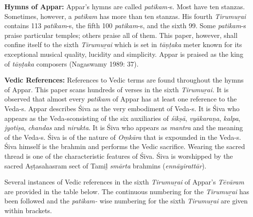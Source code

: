 \textbf{Hymns of Appar:} Appar’s hymns are called \textit{patikam-}s. Most have ten stanzas. Sometimes, however, a \textit{patikam} has more than ten stanzas. His fourth \textit{Tirumuṟai }contains 113 \textit{patikam}-s, the fifth 100 \textit{patikam}-s, and the sixth 99. Some \textit{patikam}-s praise particular temples; others praise all of them. This paper, however, shall confine itself to the sixth \textit{Tirumuṟai} which is set in \textit{tāṇṭaka} meter known for its exceptional musical quality, lucidity and simplicity. Appar is praised as the king of \textit{tāṇṭaka }composers (Nagaswamy 1989: 37).

\textbf{Vedic References:} References to Vedic terms are found throughout the hymns of Appar. This paper scans hundreds of verses in the sixth \textit{Tirumuṟai. }It is observed that almost every \textit{patikam} of Appar has at least one reference to the Veda-s. Appar describes Śiva as the very embodiment of Veda-s. It is Śiva who appears as the Veda-s\break consisting of the six auxiliaries of \textit{śikṣā}, \textit{vyākaraṇa}, \textit{kalpa}, \textit{jyotiṣa}, \textit{chandas} and \textit{nirukta}. It is Śiva who appears as \textit{mantra} and the meaning of the Veda-s. Śiva is of the nature of \textit{Oṃkāra }that is expounded in the Veda-s. Śiva himself is the brahmin and performs the Vedic sacrifice. Wearing the sacred thread is one of the characteristic features of Śiva. Śiva is worshipped by the sacred Aṣṭasahasram sect of Tamiḻ \textit{smārta} brahmins (\textit{ennāyirattār}).

Several instances of Vedic references in the sixth \textit{Tirumuṟai} of Appar’s \textit{Tēvāram} are provided in the table below. The continuous numbering for the \textit{Tirumuṟai }has been followed and the \textit{patikam-} wise numbering for the sixth \textit{Tirumuṟai }are given within brackets.

\newpage

